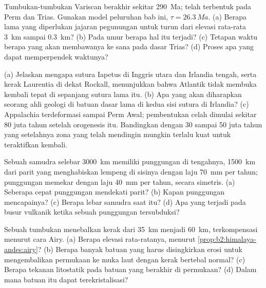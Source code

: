 \begin{exercise}[$\star\star$]\label{exo:b2:wilson-cycle:8}
Tumbukan-tumbukan Variscan berakhir sekitar \qty{290}{Ma};  telah terbentuk pada Perm dan
Trias. Gunakan model peluruhan bab ini, $\tau = \qty{26.3}{Ma}$. (a) Berapa lama yang diperlukan
jajaran pegunungan untuk turun dari elevasi rata-rata \qty{3}{km} sampai \qty{0.3}{km}? (b) Pada umur berapa hal
itu terjadi? (c) Tetapan waktu berapa yang akan membawanya ke sana pada dasar Trias? (d) Proses apa
yang dapat memperpendek waktunya?
\end{exercise}

\begin{exercise}[$\star\star$]\label{exo:b2:wilson-cycle:9}
(a) Jelaskan mengapa sutura Iapetus di Inggris utara dan Irlandia tengah, serta kerak Laurentia
di dekat Rockall, menunjukkan bahwa Atlantik tidak membuka kembali tepat di sepanjang sutura lama itu.
(b) Apa yang akan diharapkan seorang ahli geologi di batuan dasar lama di kedua sisi sutura
di Irlandia? (c) Appalachia terdeformasi sampai Perm Awal; pembentukan celah dimulai
sekitar 80 juta tahun setelah orogenesis itu. Bandingkan dengan 30 sampai 50 juta tahun yang setelahnya
zona yang telah mendingin mungkin terlalu kuat untuk teraktifkan kembali.
\end{exercise}

\begin{exercise}[$\star\star\star$]\label{exo:b2:wilson-cycle:10}
Sebuah samudra selebar \qty{3000}{km} memiliki punggungan di tengahnya, \qty{1500}{km} dari parit yang
menghabiskan lempeng di sisinya dengan laju \qty{70}{mm} per tahun; punggungan memekar dengan laju \qty{40}{mm} per
tahun, secara simetris. (a) Seberapa cepat punggungan mendekati parit? (b) Kapan punggungan
mencapainya? (c) Berapa lebar samudra saat itu? (d) Apa yang terjadi pada busur vulkanik ketika sebuah punggungan
tersubduksi?
\end{exercise}

\begin{exercise}[$\star\star\star$]\label{exo:b2:wilson-cycle:11}
Sebuah tumbukan menebalkan kerak dari \qty{35}{km} menjadi \qty{60}{km}, terkompensasi menurut cara Airy.
(a) Berapa elevasi rata-ratanya, menurut \cref{prop:b2:himalaya-andes:airy}? (b) Berapa banyak batuan yang harus
disingkirkan erosi untuk mengembalikan permukaan ke muka laut dengan kerak bertebal normal?
(c) Berapa tekanan litostatik pada batuan yang berakhir di permukaan? (d) Dalam  mana batuan itu dapat terekristalisasi?
\end{exercise}

